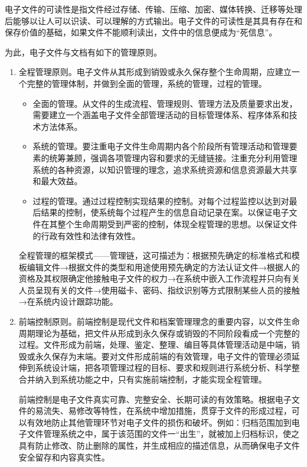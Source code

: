     电子文件的可读性是指文件经过存储、传输、压缩、加密、媒体转换、迁移等处理后能够以让人可以识读、可以理解的方式输出。电子文件的可读性是其具有存在和保存价值的基础，如果文件不能顺利读出，文件中的信息便成为“死信息”。

    为此，电子文件与文档有如下的管理原则。

    \begin{enumerate}
        \item 全程管理原则。电子文件从其形成到销毁或永久保存整个生命周期，应建立一个完整的管理体制，并做到全面的管理，系统的管理，过程的管理。
            \begin{itemize}
                \item  全面的管理。从文件的生成流程、管理规则、管理方法及质量要求出发，需要建立一个涵盖电子文件全部管理活动的目标管理体系、程序体系和技术方法体系。
                \item  系统的管理。要注重电子文件生命周期内各个阶段所有管理活动和管理要素的统筹兼顾，强调各项管理内容和要求的无缝链接。注重充分利用管理系统的各种资源，以知识管理的理念，追求系统资源和信息资源最大共享和最大效益。
                \item  过程的管理。通过过程控制实现结果的控制。对每个过程监控以达到对最后结果的控制，使系统每个过程产生的信息自动记录在案。以保证电子文件在其整个生命周期受到严密的控制，体现全程管理的思想。以保证文件的行政有效性和法律有效性。
            \end{itemize}

        全程管理的框架模式——管理链，这可描述为：根据预先确定的标准格式和模板编辑文件→根据文件的类型和用途使用预先确定的方法认证文件→根据人的资格及其权限确定他接触电子文件的权力→在系统中嵌入工作流程并只向有关人员呈现有关的文件→使用磁卡、密码、指纹识别等方式限制某些人员的接触→在系统内设计跟踪功能。

        \item 前端控制原则。前端控制是现代文件和档案管理理念的重要内容，以文件生命周期理论为基础，把文件从形成到永久保存或销毁的不同阶段看成一个完整的过程。文件形成为前端，处理、鉴定、整理、编目等具体管理活动是中端，销毁或永久保存为末端。要对文件形成前端的有效管理，电子文件的管理必须延伸到系统设计端，把各项管理过程的目标、要求和规则进行系统分析、科学整合并纳入到系统功能之中，只有实施前端控制，才能实现全程管理。

        前端控制是电子文件真实可靠、完整安全、长期可读的有效策略。根据电子文件的易流失、易修改等特性，在系统中增加措施，贯穿于文件的形成过程，可以有效地防止其他管理环节对电子文件的损伤和破坏。例如：归档范围加到电子文件管理系统之中，属于该范围的文件一“出生”，就被加上归档标识，使之具有防止修改、防止删除的属性，并生成相应的描述信息，从而确保电子文件安全留存和内容真实性。


\end{enumerate}
